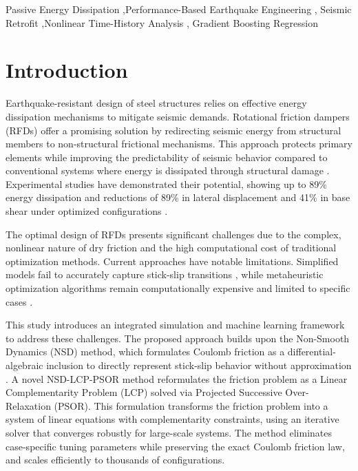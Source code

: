 \documentclass[preprint,12pt,authoryear]{elsarticle}
\begin{document}
\begin{frontmatter}
\begin{keyword}
Passive Energy Dissipation \sep Performance-Based Earthquake Engineering \sep
Seismic Retrofit \sep Nonlinear Time-History Analysis \sep
Gradient Boosting Regression
\end{keyword}

\end{frontmatter}

\section{Introduction}
\label{sec:intro}

Earthquake-resistant design of steel structures relies on effective energy dissipation mechanisms to mitigate seismic demands. Rotational friction dampers (RFDs) offer a promising solution by redirecting seismic energy from structural members to non-structural frictional mechanisms. This approach protects primary elements while improving the predictability of seismic behavior compared to conventional systems where energy is dissipated through structural damage \citep{pall_friction_1980, pall_response_1982, jaisee_state---art_2021, de_domenico_editorial_2020}. Experimental studies have demonstrated their potential, showing up to 89\% energy dissipation and reductions of 89\% in lateral displacement and 41\% in base shear under optimized configurations \citep{Mualla2002}.

The optimal design of RFDs presents significant challenges due to the complex, nonlinear nature of dry friction and the high computational cost of traditional optimization methods. Current approaches have notable limitations. Simplified models fail to accurately capture stick-slip transitions \citep{lee_seismic_2025, Jarrahi2020jbe}, while metaheuristic optimization algorithms remain computationally expensive and limited to specific cases \citep{moreschi_design_2003, moghaddam_optimal_2022, Jarrahi2020jbe, Jarrahi2020sdee}.

This study introduces an integrated simulation and machine learning framework to address these challenges. The proposed approach builds upon the Non-Smooth Dynamics (NSD) method, which formulates Coulomb friction as a differential-algebraic inclusion to directly represent stick-slip behavior without approximation \citep{Namorado2022}. A novel NSD-LCP-PSOR method reformulates the friction problem as a Linear Complementarity Problem (LCP) solved via Projected Successive Over-Relaxation (PSOR). This formulation transforms the friction problem into a system of linear equations with complementarity constraints, using an iterative solver that converges robustly for large-scale systems. The method eliminates case-specific tuning parameters while preserving the exact Coulomb friction law, and scales efficiently to thousands of configurations.
\end{document}
